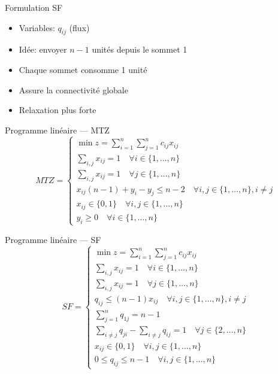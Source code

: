 \documentclass{beamer}
\begin{document}
\begin{frame}{Formulation SF}
\begin{itemize}
    \item Variables: $q_{ij}$ (flux)
    \item Idée: envoyer $n-1$ unités depuis le sommet 1
    \item Chaque sommet consomme 1 unité
\end{itemize}

\begin{itemize}
    \item Assure la connectivité globale
    \item Relaxation plus forte
\end{itemize}
\end{frame}

\begin{frame}{Programme linéaire --- MTZ}
    \begin{equation*}
        MTZ = 
        \begin{cases}
            \min z = \sum_{i=1}^n \sum_{j=1}^n c_{ij} x_{ij} \\
            \sum_{i,j} x_{ij} = 1 \quad \forall i \in \{1, \ldots, n\} \\
            \sum_{i,j} x_{ij} = 1 \quad \forall j \in \{1, \ldots, n\} \\
            x_{ij} (n-1) + y_i - y_j \leq n-2 \quad \forall i,j \in \{1, \ldots, n\}, i \neq j \\
            x_{ij} \in \{0,1\} \quad \forall i,j \in \{1, \ldots, n\} \\
            y_i \geq 0 \quad \forall i \in \{1, \ldots, n\}
        \end{cases}
    \end{equation*}
\end{frame}

\begin{frame}{Programme linéaire --- SF}
    \begin{equation*}
        SF = 
		\begin{cases}
			\min z = \sum_{i=1}^n \sum_{j=1}^n c_{ij} x_{ij} \\
			\sum_{i,j} x_{ij} = 1 \quad \forall i \in \{1, \ldots, n\} \\
			\sum_{i,j} x_{ij} = 1 \quad \forall j \in \{1, \ldots, n\} \\
			q_{ij} \leq (n-1) x_{ij} \quad \forall i,j \in \{1, \ldots, n\}, i \neq j \\
			\sum_{j=1}^n q_{1j} = n-1 \\
			\sum_{i\neq j} q_{ji} - \sum_{i\neq j} q_{ij} = 1 \quad \forall j \in \{2, \ldots, n\} \\
			x_{ij} \in \{0,1\} \quad \forall i,j \in \{1, \ldots, n\} \\
			0 \leq q_{ij} \leq n-1 \quad \forall i,j \in \{1, \ldots, n\}
		\end{cases}
    \end{equation*}
\end{frame}
\end{document}
